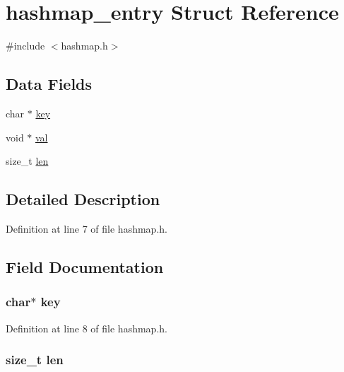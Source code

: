 \hypertarget{structhashmap__entry}{\section{hashmap\+\_\+entry Struct Reference}
\label{structhashmap__entry}
}


{\ttfamily \#include $<$hashmap.\+h$>$}

\subsection*{Data Fields}
\begin{DoxyCompactItemize}
\item 
char $\ast$ \hyperlink{structhashmap__entry_a5892a9181e6a332f84d27aecd41dcd12}{key}
\item 
void $\ast$ \hyperlink{structhashmap__entry_ab03f36f103bdec81305fd301f1f93885}{val}
\item 
size\+\_\+t \hyperlink{structhashmap__entry_a7360b55975153b822efc5217b7734e6a}{len}
\end{DoxyCompactItemize}


\subsection{Detailed Description}


Definition at line 7 of file hashmap.\+h.



\subsection{Field Documentation}
\hypertarget{structhashmap__entry_a5892a9181e6a332f84d27aecd41dcd12}{
\subsubsection[{key}]{\setlength{\rightskip}{0pt plus 5cm}char$\ast$ key}}\label{structhashmap__entry_a5892a9181e6a332f84d27aecd41dcd12}


Definition at line 8 of file hashmap.\+h.

\hypertarget{structhashmap__entry_a7360b55975153b822efc5217b7734e6a}{
\subsubsection[{len}]{\setlength{\rightskip}{0pt plus 5cm}size\+\_\+t len}}\label{structhashmap__entry_a7360b55975153b822efc5217b7734e6a}


